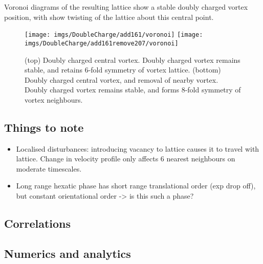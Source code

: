 Voronoi diagrams of the resulting lattice show a stable doubly charged vortex position, with show twisting of the lattice about this central
point.

\begin{figure}[tb]
	\texttt{[image: imgs/DoubleCharge/add161/voronoi]}
	\texttt{[image: imgs/DoubleCharge/add161remove207/voronoi]}
	\caption{(top) Doubly charged central vortex. Doubly charged vortex remains stable, and retains 6-fold
	symmetry of vortex lattice. (bottom) Doubly charged central vortex, and removal of nearby vortex. Doubly charged vortex remains stable, and forms 8-fold
	symmetry of vortex neighbours.}
	\label{fig:voronoi_double}
\end{figure}


\subsection{Things to note}

\begin{itemize}
\item Localised disturbances: introducing vacancy to lattice causes it to travel with lattice. Change in velocity profile only affects 6
nearest neighbours on moderate timescales.
\item Long range hexatic phase has short range translational order (exp drop off), but constant orientational order -> is this such a phase?
\end{itemize}

\subsection{Correlations}



\subsection{Numerics and analytics}\label{sec:numerics}

